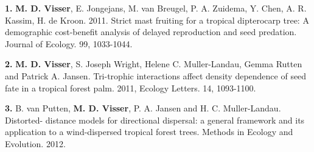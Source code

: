 \begin{description}
\tightlist
\item[2011]
\textbf{1.} \textbf{M. D. Visser}, E. Jongejans, M. van Breugel, P. A.
Zuidema, Y. Chen, A. R. Kassim, H. de Kroon. 2011. Strict mast fruiting
for a tropical dipterocarp tree: A demographic cost-benefit analysis of
delayed reproduction and seed predation. Journal of Ecology. 99,
1033-1044.

\textbf{2.} \textbf{M. D. Visser}, S. Joseph Wright, Helene C.
Muller-Landau, Gemma Rutten and Patrick A. Jansen. Tri-trophic
interactions affect density dependence of seed fate in a tropical forest
palm. 2011, Ecology Letters. 14, 1093-1100.
\item[2012]
\textbf{3.} B. van Putten, \textbf{M. D. Visser}, P. A. Jansen and H. C.
Muller-Landau. Distorted- distance models for directional dispersal: a
general framework and its application to a wind-dispersed tropical
forest trees. Methods in Ecology and Evolution. 2012.


\end{description}
